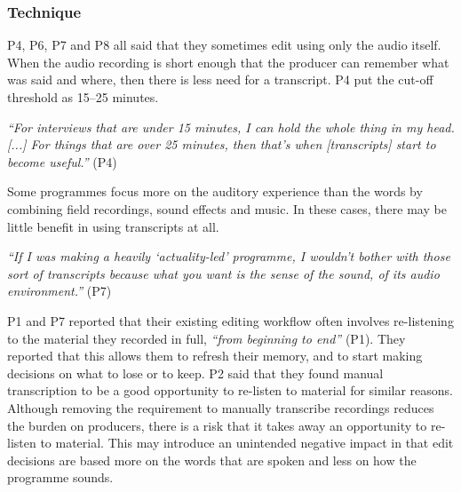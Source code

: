 



\subsubsection{Technique}

P4, P6, P7 and P8 all said that they sometimes edit using only the audio itself. When the audio recording 
is short enough that the producer can remember what was said and where, then there is less need for a transcript. P4
put the cut-off threshold as 15--25 minutes.

\textit{``For interviews that are under 15 minutes, I can hold the whole thing in my head. [...] For things
that are over 25 minutes, then that's when [transcripts] start to become useful.''} (P4)

Some programmes focus more on the auditory experience than the words by combining field recordings, sound effects and
music.  In these cases, there may be little benefit in using transcripts at all.

\textit{``If I was making a heavily `actuality-led' programme, I wouldn't bother with those sort of transcripts because
what you want is the sense of the sound, of its audio environment.''} (P7)

P1 and P7 reported that their existing editing workflow often involves re-listening to the material they recorded in
full, \textit{``from beginning to end''} (P1). They reported that this allows them to refresh their memory, and to
start making decisions on what to lose or to keep.
P2 said that they found manual transcription to be a good opportunity to re-listen to material for similar
reasons.
Although removing the requirement to manually transcribe recordings reduces the burden on producers, there is a risk
that it takes away an opportunity to re-listen to material. This may introduce an unintended negative impact in that
edit decisions are based more on the words that are spoken and less on how the programme sounds.

